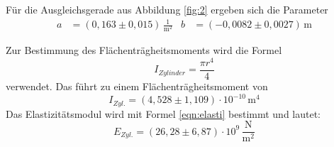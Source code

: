 Für die Ausgleichsgerade aus Abbildung \ref{fig:2} ergeben sich die Parameter
\begin{align*}
  a &= (0,163 \pm 0,015) \, \mathrm{\frac{1}{m^2}} & b &= (-0,0082 \pm 0,0027) \, \mathrm{m}
\end{align*}

Zur Bestimmung des Flächenträgheitsmoments wird die Formel
\begin{equation*}
  I_{Zylinder} =  \frac{\pi r^4}{4}
\end{equation*}
verwendet. Das führt zu einem Flächenträgheitsmoment von
\begin{equation*}
  I_{Zyl.} = (4,528 \pm 1,109)\cdot 10^{-10} \, \mathrm{m^4}
\end{equation*}
Das Elastizitätsmodul wird mit Formel \ref{eqn:elasti} bestimmt und lautet:
\begin{equation*}
  E_{Zyl.} = (26,28 \pm 6,87) \cdot 10^9 \, \mathrm{\frac{N}{m^2}}
\end{equation*}
\newpage
